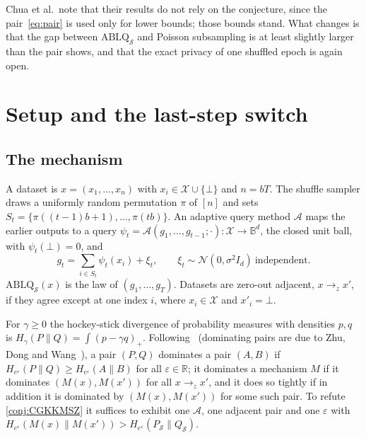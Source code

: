 \documentclass[11pt]{amsart}
\theoremstyle{definition}
\theoremstyle{remark}
\newcommand{\R}{\mathbb R}
\newcommand{\N}{\mathcal N}
\newcommand{\Ball}{\mathbb B}
\newcommand{\He}{H_{e^{\varepsilon}}}
\begin{document}
Chua et al.\ note that their results do not rely on the conjecture, since the pair~\eqref{eq:pair} is used only for lower bounds; those bounds stand. What changes is that the gap between $\mathrm{ABLQ}_{\mathcal S}$ and Poisson subsampling is at least slightly larger than the pair shows, and that the exact privacy of one shuffled epoch is again open.

\section{Setup and the last-step switch}\label{sec:setup}

\subsection{The mechanism}
A dataset is $x=(x_1,\dots,x_n)$ with $x_i\in\mathcal X\cup\{\bot\}$ and $n=bT$. The shuffle sampler draws a uniformly random permutation $\pi$ of $[n]$ and sets $S_t=\{\pi((t-1)b+1),\dots,\pi(tb)\}$. An adaptive query method $\mathcal A$ maps the earlier outputs to a query $\psi_t=\mathcal A(g_1,\dots,g_{t-1};\cdot)\colon\mathcal X\to\Ball^d$, the closed unit ball, with $\psi_t(\bot)=0$, and
\[
g_t=\sum_{i\in S_t}\psi_t(x_i)+\xi_t,\qquad \xi_t\sim\N(0,\sigma^2I_d)\ \text{independent}.
\]
$\mathrm{ABLQ}_{\mathcal S}(x)$ is the law of $(g_1,\dots,g_T)$. Datasets are zero-out adjacent, $x\to_z x'$, if they agree except at one index $i$, where $x_i\in\mathcal X$ and $x'_i=\bot$.

For $\gamma\ge0$ the hockey-stick divergence of probability measures with densities $p,q$ is $H_\gamma(P\|Q)=\int(p-\gamma q)_+$. Following~\cite[Definition~2.3]{CGKKMSZ24} (dominating pairs are due to Zhu, Dong and Wang~\cite{ZDW21}), a pair $(P,Q)$ dominates a pair $(A,B)$ if $\He(P\|Q)\ge\He(A\|B)$ for all $\varepsilon\in\R$; it dominates a mechanism $M$ if it dominates $(M(x),M(x'))$ for all $x\to_z x'$, and it does so tightly if in addition it is dominated by $(M(x),M(x'))$ for some such pair. To refute \cref{conj:CGKKMSZ} it suffices to exhibit one $\mathcal A$, one adjacent pair and one $\varepsilon$ with $\He(M(x)\|M(x'))>\He(P_{\mathcal S}\|Q_{\mathcal S})$.
\end{document}
